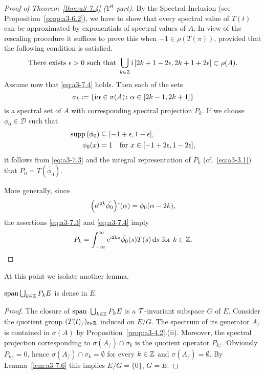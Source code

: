 \begin{proof}[Proof of Theorem~\ref{thm:a3-7.4} ($1^{\text{st}} $ part)]
By the Spectral Inclusion (see Proposition~\ref{prop:a3-6.2}), we have to show that every spectral value of $T(t)$ can be approximated by exponentials of spectral values of $A$.
In view of the rescaling procedure it suffices to prove this when $-1 \in \rho(T(\pi))$, provided that the following condition is satisfied.
\begin{equation}\label{eq:a3-7.4}
	\text{There exists } \epsilon > 0 \text{ such that } \bigcup_{k\in\mathbb{Z}} \mathrm{i}\,[2k+1-2\epsilon,2k+1+2\epsilon] \subset 	\rho(A) .
\end{equation}
Assume now that \eqref{eq:a3-7.4} holds.
Then each of the sets 
\[
	\sigma_{k}\coloneqq \{\mathrm{i}\alpha \in \sigma(A) \colon \alpha \in [2k-1,2k+1]\}
\] 
is a spectral set of $A$ with corresponding spectral projection $P_{k}$.
If we choose $\phi_{0} \in \mathcal{D}$ such that 
\begin{align*}
	\mathop{}\!\mathrm{supp}\,(\phi_{0}) &\subseteq [-1+\epsilon,1-\epsilon], \\
	\phi_{0}(x) & = 1 \quad \text{for $x \in [-1 + 2\epsilon,1 - 2\epsilon]$}, 
\end{align*}
it follows from \eqref{eq:a3-7.3} and the integral representation of $P_{k}$ (cf.\ \eqref{eq:a3-3.1}) that $P_{0} = T(\check{\phi_{0}})$.

More generally, since %
\[
	\left(\mathrm{e}^{\mathrm{i} 2k}\check{\phi_{0}}\right){\hat{ }}\,(\alpha) = \phi_{0}(\alpha-2k) ,
\]
%
the assertions \eqref{eq:a3-7.3} and \eqref{eq:a3-7.4} imply
\begin{equation}\label{eq:a3-7.5}
P_{k} = \int_{-\infty}^{\infty} \mathrm{e}^{\mathrm{i} 2ks}\check{\phi_{0}}(s)T(s)\mathop{}\!\mathrm{d}{s} \text{ for } k \in \mathbb{Z} .
\end{equation}
\end{proof}
At this point we isolate another lemma.
\begin{lemma}\label{lem:a3-7.7}
$\mathrm{span }\bigcup_{k\in\mathbb{Z}} P_{k}E$ is dense in $E$.
\end{lemma}
\begin{proof}
The closure of $\text{span }\bigcup_{k\in\mathbb{Z}} P_{k}E$ is a $\mathcal{T}$-invariant subspace $G$ of $E$.
Consider the quotient group $(T(t)_/)_{t\in\mathbb{R}}$ induced on $E/G$.
The spectrum of its generator $A_{/}$ is contained in $\sigma(A)$ by Proposition~\ref{prop:a3-4.2}.(ii).
Moreover, the spectral projection corresponding to $\sigma(A_{/}) \cap \sigma_{k}$ is the quotient operator $P_{k/}$.
Obviously $P_{k/} = 0$, hence $\sigma(A_{/}) \cap \sigma_{k} = \emptyset$ for every $k \in \mathbb{Z}$ and $\sigma(A_{/}) = \emptyset$.
By Lemma~\ref{lem:a3-7.6} this implies $E/G = \{0\}$, \ie $G = E$.
\end{proof}
